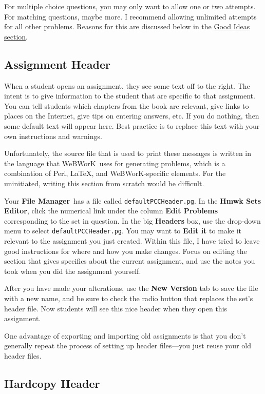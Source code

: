 \documentclass[12pt]{article}
\newcommand{\menu}[1]{\textbf{#1}}
\newcommand{\WW}{WeBWorK}
\newcommand{\HSE}{\menu{Hmwk Sets Editor}}
\newcommand{\FM}{\menu{File Manager}}
\begin{document}
For multiple choice questions, you may only want to allow one or two attempts.  For matching questions, maybe more. I recommend allowing unlimited attempts for all other problems.  Reasons for this are discussed below in the \hyperref[goodideas]{Good Ideas section}.  

\subsection{Assignment Header}  When a student opens an assignment, they see some text off to the right.  The intent is to give information to the student that are specific to that assignment.  You can tell students which chapters from the book are relevant, give links to places on the Internet, give tips on entering answers, etc. If you do nothing, then some default text will appear here.  Best practice is to replace this text with your own instructions and warnings.  

Unfortunately, the source file that is used to print these messages is written in the language that \WW\ uses for generating problems, which is a combination of Perl, \LaTeX, and \WW-specific elements.  For the uninitiated, writing this section from scratch would be difficult. 

Your \FM\  has a file called \texttt{defaultPCCHeader.pg}.   In the \HSE, click the numerical link under the column \menu{Edit Problems} corresponding to the set in question.  In the big \menu{Headers} box, use the drop-down menu to select \texttt{defaultPCCHeader.pg}.  You may want to \menu{Edit it} to make it relevant to the assignment you just created.  Within this file, I have tried to leave good instructions for where and how you make changes.  Focus on editing the section that gives specifics about the current assignment, and use the notes you took when you did the assignment yourself.

After you have made your alterations, use the \menu{New Version} tab to save the file with a new name, and be sure to check the radio button that replaces the set's header file.  Now students will see this nice header when they open this assignment.

One advantage of exporting and importing old assignments is that you don't generally repeat the process of setting up header files---you just reuse your old header files.

\subsection{Hardcopy Header} 
\end{document}
